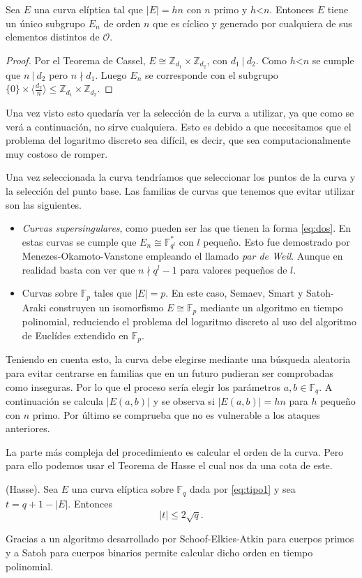 \begin{lema}
		Sea $E$ una curva elíptica tal que $|E|=hn$ con $n$ primo y $h$\textless $n$. Entonces $E$ tiene un único subgrupo $E_n$ de orden $n$ que es cíclico y generado por cualquiera de sus elementos distintos de $\mathcal{O}$.
\end{lema}
\begin{proof}
		Por el Teorema de Cassel, $E\cong \mathbb{Z}_{d_1}\times \mathbb{Z}_{d_2}$, con $d_1\:|\:d_2$. Como $h$\textless$n$ se cumple que $n\:|\:d_2$ pero $n \nmid d_1$. Luego $E_n$ se corresponde con el subgrupo $\{0\}\times \langle \frac{d_2}{n} \rangle\leq\mathbb{Z}_{d_1}\times\mathbb{Z}_{d_2}$.
\end{proof}

Una vez visto esto quedaría ver la selección de la curva a utilizar, ya que como se verá a continuación, no sirve cualquiera. Esto es debido a que necesitamos que el problema del logaritmo discreto sea difícil, es decir, que sea computacionalmente muy costoso de romper.

Una vez seleccionada la curva tendríamos que seleccionar los puntos de la curva y la selección del punto base.
Las familias de curvas que tenemos que evitar utilizar son las siguientes.
\begin{itemize}
	\item \emph{Curvas supersingulares}, como pueden ser las que tienen la forma \eqref{eq:dos}. En estas curvas se cumple que $E_n\cong \mathbb{F}_{q^l}^*$ con $l$ pequeño. Esto fue demostrado por Menezes-Okamoto-Vanstone empleando el llamado \emph{par de Weil}. Aunque en realidad basta con ver que $n\nmid q^l-1$ para valores pequeños de $l$.
	\item Curvas sobre $\mathbb{F}_p$ tales que $|E|=p$. En este caso, Semaev, Smart y Satoh-Araki construyen un isomorfismo $E\cong\mathbb{F}_p$ mediante un algoritmo en tiempo polinomial, reduciendo el problema del logaritmo discreto al uso del algoritmo de Euclídes extendido en $\mathbb{F}_p$.
\end{itemize}
Teniendo en cuenta esto, la curva debe elegirse mediante una búsqueda aleatoria para evitar centrarse en familias que en un futuro pudieran ser comprobadas como inseguras. Por lo que el proceso sería elegir los parámetros $a,b\in \mathbb{F}_q$. A continuación se calcula $|E(a,b)|$ y se observa si $|E(a,b)|=hn$ para $h$ pequeño con $n$ primo. Por último se comprueba que no es vulnerable a los ataques anteriores.

La parte más compleja del procedimiento es calcular el orden de la curva. Pero para ello podemos usar el Teorema de Hasse el cual nos da una cota de este.
\begin{teorema}
	(Hasse). Sea $E$ una curva elíptica sobre $\mathbb{F}_q$ dada por \eqref{eq:tipo1} y sea $t=q+1-|E|$. Entonces
	$$
		|t|\leq2\sqrt{q}.
	$$
\end{teorema}
Gracias a un algoritmo desarrollado por Schoof-Elkies-Atkin para cuerpos primos y a Satoh para cuerpos binarios permite calcular dicho orden en tiempo polinomial.

